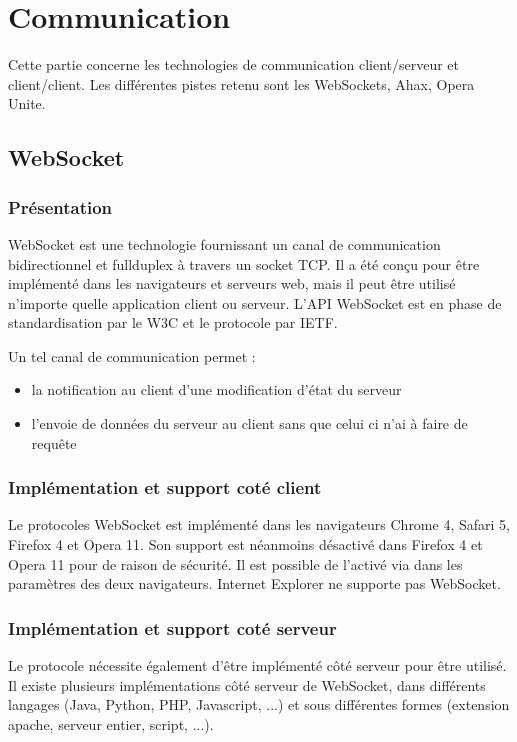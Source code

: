 \documentclass[a4paper,10pt]{report}
\begin{document}
\chapter{Communication}

Cette partie concerne les technologies de communication client/serveur et 
client/client. Les différentes pistes retenu sont les WebSockets, Ahax, 
Opera Unite.

  \section{WebSocket}

    \subsection{Présentation}

WebSocket est une technologie fournissant un canal de communication bidirectionnel 
et fullduplex à travers un socket TCP. Il a été conçu pour être implémenté dans 
les navigateurs et serveurs web, mais il peut être utilisé n'importe quelle 
application client ou serveur. L'API WebSocket est en phase de standardisation 
par le W3C et le protocole par IETF.


Un tel canal de communication permet :
\begin{itemize}
  \item la notification au client d'une modification d'état du serveur
  \item l'envoie de données du serveur au client sans que celui ci n'ai à faire de requête
\end{itemize}


    \subsection{Implémentation et support coté client}

Le protocoles WebSocket est implémenté dans les navigateurs Chrome 4, Safari 5, 
Firefox 4 et Opera 11. Son support est néanmoins désactivé dans Firefox 4 et 
Opera 11 pour de raison de sécurité. Il est possible de l'activé via dans les 
paramètres des deux navigateurs. Internet Explorer ne supporte pas WebSocket.


    \subsection{Implémentation et support coté serveur}

Le protocole nécessite également d'être implémenté côté serveur pour être 
utilisé. Il existe plusieurs implémentations côté serveur de WebSocket, 
dans différents langages (Java, Python, PHP, Javascript, ...) et sous 
différentes formes (extension apache, serveur entier, script, ...).
\end{document}
